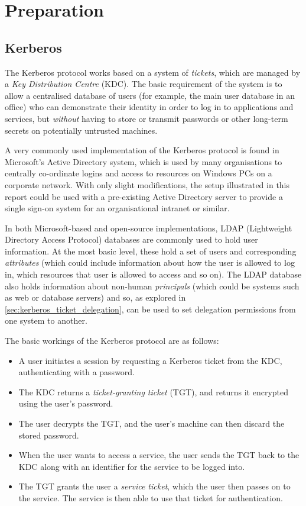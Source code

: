\documentclass[12pt]{report}
\begin{document}
\chapter{Preparation}

\section{Kerberos}
The Kerberos protocol works based on a system of \textit{tickets}, which are managed by a \textit{Key Distribution Centre} (KDC). The basic requirement of the system is to allow a centralised database of users (for example, the main user database in an office) who can demonstrate their identity in order to log in to applications and services, but \textit{without} having to store or transmit passwords or other long-term secrets on potentially untrusted machines.

A very commonly used implementation of the Kerberos protocol is found in Microsoft's Active Directory system, which is used by many organisations to centrally co-ordinate logins and access to resources on Windows PCs on a corporate network. With only slight modifications, the setup illustrated in this report could be used with a pre-existing Active Directory server to provide a single sign-on system for an organisational intranet or similar.

In both Microsoft-based and open-source implementations, LDAP (Lightweight Directory Access Protocol) databases are commonly used to hold user information. At the most basic level, these hold a set of users and corresponding \textit{attributes} (which could include information about how the user is allowed to log in, which resources that user is allowed to access and so on). The LDAP database also holds information about non-human \textit{principals} (which could be systems such as web or database servers) and so, as explored in \autoref{sec:kerberos_ticket_delegation}, can be used to set delegation permissions from one system to another.

The basic workings of the Kerberos protocol are as follows:

\begin{itemize}
\item
  A user initiates a session by requesting a Kerberos ticket from the KDC, authenticating with a password.
\item
  The KDC returns a \textit{ticket-granting ticket} (TGT), and returns it encrypted using the user's password.
\item
  The user decrypts the TGT, and the user's machine can then discard the stored password.
\item
  When the user wants to access a service, the user sends the TGT back to the KDC along with an identifier for the service to be logged into.
\item
  The TGT grants the user a \textit{service ticket}, which the user then passes on to the service. The service is then able to use that ticket for authentication.
\end{itemize}
\end{document}
